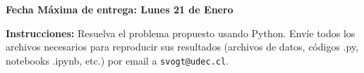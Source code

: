 \documentclass[11pt]{exam}
\begin{document}
\firstpageheadrule
\runningheadrule
{}
\cfoot{ }
\begin{flushleft}
\vspace{0.2in}
\vspace{0.25cm}
\end{flushleft}

\begin{center}
\textbf{Fecha Máxima de entrega: Lunes 21 de Enero}
\end{center}
\textbf{Instrucciones:} \noindent Resuelva el problema propuesto usando Python. Envíe todos los archivos necesarios para reproducir sus resultados (archivos de datos, códigos .py, notebooks .ipynb, etc.) por email a \texttt{svogt@udec.cl}.

\bigskip
\end{document}
